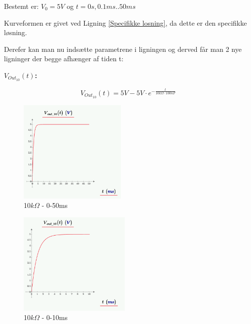 Bestemt er:
$V_{0}=5V$ og $t=0s,0.1ms..50ms$

Kurveformen er givet ved Ligning \ref{Specifikke losning}, da dette er den specifikke løsning.



Derefer kan man nu indsætte parametrene i ligningen og derved får man 2 nye ligninger der begge afhænger af tiden t:

\textbf{$V_{Out_{10}}(t)$:}
\begin{center}
\begin{equation}
V_{Out_{10}}(t) = 5V-5V \cdot e^{-\frac{t}{10k\Omega \cdot 100nF}} 
\label{V_Out_10}
\end{equation}
\end{center}



\begin{figure}[h]
\begin{center}
\includegraphics[height=5cm]{M_Fig/V_out_10_1}
\caption{10$k\Omega$ - 0-50ms}
\label{10kOhm50ms}
\end{center}
\end{figure}

\begin{figure}[h]
\begin{center}
\includegraphics[height=5cm]{M_Fig/V_out_10_2}
\caption{10$k\Omega$ - 0-10ms}
\label{10kOhm10ms}
\end{center}
\end{figure}


